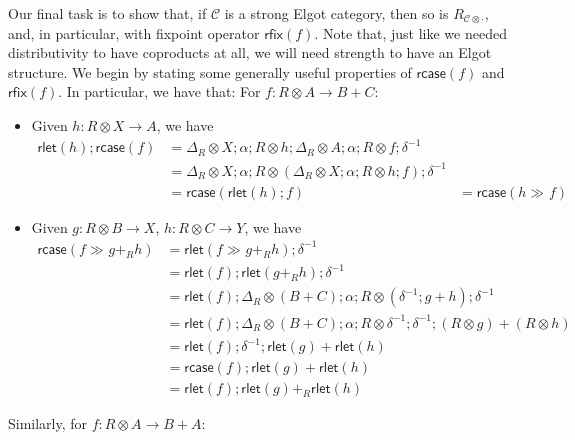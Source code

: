\documentclass[acmsmall,screen,review]{acmart}
\newcommand{\mc}[1]{\ensuremath{\mathcal{#1}}}
\newcommand{\ms}[1]{\ensuremath{\mathsf{#1}}}
\newcommand{\dmor}[1]{{\Delta}_{#1}}
\newcommand{\envcom}[2]{{#1}_{#2 \otimes \cdot}}
\newcommand{\rlmor}[1]{\ms{rlet}(#1)}
\newcommand{\rcase}[1]{\ms{rcase}(#1)}
\newcommand{\rfix}[1]{\ms{rfix}(#1)}
\newcommand{\rseq}[3]{#2 \gg_{#1} #3}
\begin{document}
Our final task is to show that, if $\mc{C}$ is a strong Elgot category, then so is
$\envcom{R}{\mc{C}}$, and, in particular, with fixpoint operator $\rfix{f}$. Note that, just like we
needed distributivity to have coproducts at all, we will need strength to have an Elgot structure.
We begin by stating some generally useful properties of $\rcase{f}$ and $\rfix{f}$. In
particular, we have that: For $f: R \otimes A \to B + C$:
\begin{itemize}
  \item Given $h : R \otimes X \to A$, we have
  \begin{equation}
    \begin{aligned}
    \rlmor{h} ; \rcase{f} 
    & = \dmor{R} \otimes X ; \alpha ; R \otimes h 
      ; \dmor{R} \otimes A ; \alpha ; R \otimes f ; \delta^{-1} \\
    & = \dmor{R} \otimes X ; \alpha 
      ; R \otimes (\dmor{R} \otimes X ; \alpha ; R \otimes h ; f) ; \delta^{-1} \\
    & = \rcase{\rlmor{h} ; f} & = \rcase{\rseq{}{h}{f}}
    \end{aligned}
  \end{equation}
  \item Given $g : R \otimes B \to X$, $h : R \otimes C \to Y$, we have
  \begin{equation}
    \begin{aligned}
    \rcase{\rseq{}{f}{g +_R h}}
    & = \rlmor{\rseq{}{f}{g +_R h}} ; \delta^{-1} \\
    & = \rlmor{f} ; \rlmor{g +_R h} ; \delta^{-1} \\
    & = \rlmor{f} 
      ; \dmor{R} \otimes (B + C) ; \alpha ; R \otimes (\delta^{-1} ; g + h) ; \delta^{-1} \\
    & = \rlmor{f} 
      ; \dmor{R} \otimes (B + C) ; \alpha ; R \otimes \delta^{-1} ; \delta^{-1} 
      ; (R \otimes g) + (R \otimes h) \\
    & = \rlmor{f} ; \delta^{-1} ; \rlmor{g} + \rlmor{h} \\
    & = \rcase{f} ; \rlmor{g} + \rlmor{h} \\
    & = \rlmor{f} ; \rlmor{g} +_R \rlmor{h}
    \end{aligned}
  \end{equation}
\end{itemize}
Similarly, for $f : R \otimes A \to B + A$:
\end{document}
